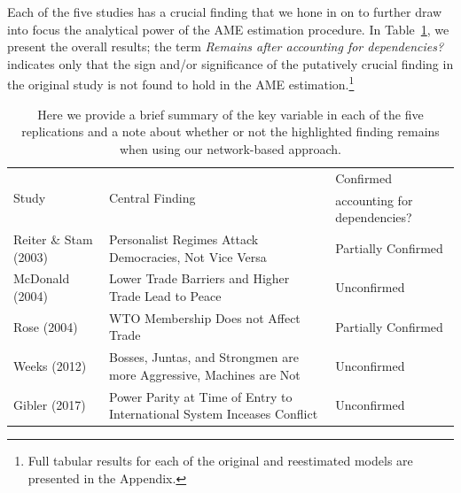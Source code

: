 \documentclass{article}[12pt]
\begin{document}
Each of the five studies has a crucial finding that we hone in on to
further draw into focus the analytical power of the AME estimation
procedure.  In Table~\ref{tab:modelFindingSumm}, we present the
overall results; the term \textit{Remains after accounting for
  dependencies?} indicates only that the sign and/or significance of
the putatively crucial finding in the original study is not found to
hold in the AME estimation.\footnote{Full tabular results for each of
  the original and reestimated models are presented in the Appendix.}

\begin{table}[ht]
\centering
\caption{Here we provide a brief summary of the key variable in each
  of the five replications and a note about whether or not the
  highlighted finding remains when using our network-based approach.}
	\begin{tabular}{l p{7cm} l} \toprule
		\multirow{2}{*}{Study} & \multirow{2}{*}{Central
                  Finding} &  Confirmed \\ 
			& &  accounting for dependencies? \\ \toprule
		Reiter \& Stam (2003) & Personalist Regimes Attack Democracies, Not Vice Versa & {Partially Confirmed} \\ \midrule
		McDonald (2004) & Lower Trade Barriers and Higher Trade Lead to Peace & {Unconfirmed}\\ \midrule
		Rose (2004) & WTO Membership Does not Affect Trade & {Partially Confirmed}\\ \midrule
		Weeks (2012) & Bosses, Juntas, and Strongmen are more Aggressive, Machines are Not & {Unconfirmed} \\\midrule
		Gibler (2017) & Power Parity at Time of Entry to International System Inceases Conflict & {Unconfirmed}\\ \bottomrule
	\end{tabular}
	\label{tab:modelFindingSumm}
\end{table}
\end{document}
